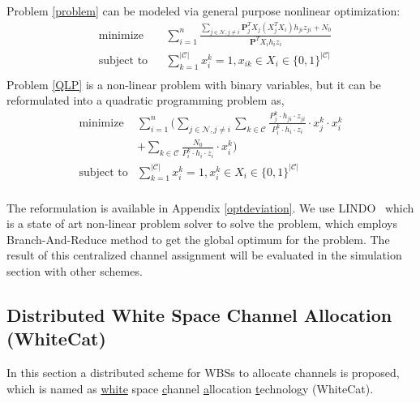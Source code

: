 \documentclass[times]{ettauth}
\theoremstyle{mytheoremstyle}
\theoremstyle{mytheoremstyle}
\theoremstyle{mytheoremstyle}
\renewcommand{\vec}[1]{\mathbf{#1}}
\begin{document}
Problem \ref{problem} can be modeled via general purpose nonlinear optimization:
	\begin{equation}
\label{QLP}
		\begin{aligned}
		& \underset{}{\text{minimize}}
		& & \sum\limits^{n}_{i=1} \frac{\sum\limits_{j\in\mathcal{N}, j\neq i}\vec{P}_j^TX_j(X_j^TX_i)h_{ji}z_{ji} + N_0}{\vec{P}^TX_ih_iz_i}\\
		& \text{subject to}
		& & \sum\limits_{k=1}^{|\mathcal{C}|}x_i^k=1, x_{ik}\in X_i\in \{0,1\}^{|\mathcal{C}|}\\
		\end{aligned}
	\end{equation}
Problem \ref{QLP} is a non-linear problem with binary variables, but it can be reformulated into a quadratic programming problem as,
	\begin{equation}
\label{QLP_2}
			\begin{aligned}
			\underset{}{\text{minimize}}
			& \sum\limits^{n}_{i=1} ( \sum\limits_{j\in\mathcal{N}, j\neq i}\sum\limits_{k\in\mathcal{C}} \frac{P_j^k\cdot h_{ji}\cdot z_{ji}}{P_i^k\cdot h_i\cdot z_i}\cdot  x_j^k\cdot x_i^k  \\
			& + \sum\limits_{k\in\mathcal{C}} \frac{N_0}{P_i^k\cdot h_i\cdot z_i}\cdot x_i^k)\\
			\text{subject to} 
			& \sum\limits_{k=1}^{|\mathcal{C}|}x_i^k=1, x_i^k\in X_i\in \{0,1\}^{|\mathcal{C}|}\\
			\end{aligned}
		\end{equation}

The reformulation is available in Appendix \ref{optdeviation}.
We use LINDO~\cite{lindo} which is a state of art non-linear problem solver to solve the problem, which employs Branch-And-Reduce method to get the global optimum for the problem. %
The result of this centralized channel assignment will be evaluated in the simulation section with other schemes. 



\subsection{Distributed White Space Channel Allocation (WhiteCat)}
\label{whitecat}
In this section a distributed scheme for WBSs to allocate channels is proposed, which is named as \underline{white} space \underline{c}hannel \underline{a}llocation \underline{t}echnology (WhiteCat). 
\end{document}
